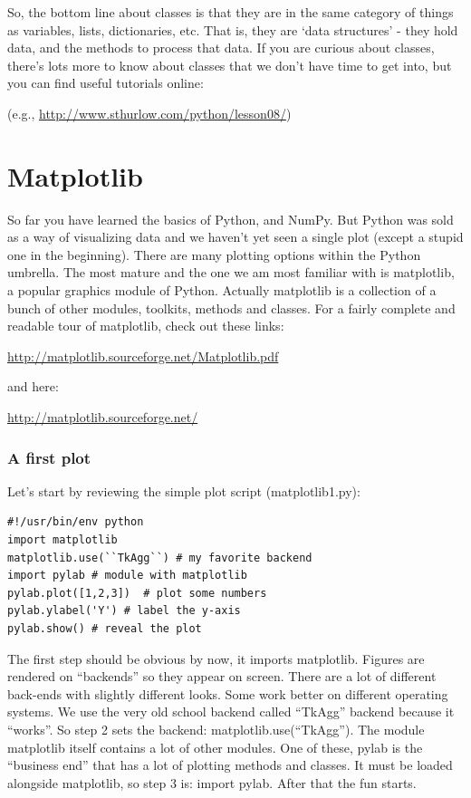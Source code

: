 \documentclass[11pt]{book}
\begin{document}
{{So, the bottom line about classes is that they are  in the same category of things as variables, lists, dictionaries, etc. That is, they are  `data structures' - they hold data, and the methods to process that data.
If you are curious about classes, there's lots more to know about classes that we don't have time to get into, but you can find useful tutorials online:

 (e.g., \url{http://www.sthurlow.com/python/lesson08/})



\section{Matplotlib}

So far you have learned the basics of Python, and NumPy.  But Python was sold as a way of visualizing data and we haven't yet seen a single plot (except a stupid one in the beginning). There are many plotting options within the Python umbrella. The most mature and the one we am most familiar with is {\color{blue}matplotlib}, a popular  graphics module of Python.
Actually  {\color{blue}matplotlib} is a collection of a bunch of other modules, toolkits, methods and  classes.   For a fairly complete and readable tour of matplotlib, check out these links:

\url{http://matplotlib.sourceforge.net/Matplotlib.pdf}

\noindent
and here:

\url{http://matplotlib.sourceforge.net/}




\subsubsection{A first plot}

Let's start by reviewing the   simple plot script ({\color{blue}matplotlib1.py}):


{ \color{blue} \begin{verbatim}
#!/usr/bin/env python
import matplotlib
matplotlib.use(``TkAgg``) # my favorite backend
import pylab # module with matplotlib
pylab.plot([1,2,3])  # plot some numbers
pylab.ylabel('Y') # label the y-axis
pylab.show() # reveal the plot
\end{verbatim}}



The first step should be obvious by now, it imports {\color{blue}matplotlib}.
Figures are rendered on ``backends'' so they appear on screen.  There are a lot of different back-ends with slightly different looks.  Some work better on different operating systems. We use the very old school backend called  ``TkAgg'' backend because it ``works''.  So step 2  sets the backend: {\color{blue}matplotlib.use(``TkAgg'')}.  The module {\color{blue}matplotlib} itself contains a lot of other modules.  One of these,
{\color{blue}pylab} is the ``business end'' that has a lot of plotting methods and classes.  It must be  loaded alongside {\color{blue}matplotlib},   so step 3 is:  {\color{blue}import pylab}. After that the fun starts.

}}
\end{document}
